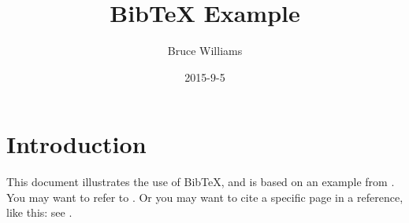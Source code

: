 \documentclass[12pt]{article}
\begin{document}
\title{BibTeX Example}
\author{Bruce Williams}
\date{2015-9-5}

\maketitle

\section{Introduction}
This document illustrates the use of BibTeX, and is based on an example from \cite{mjo08}.
You may want to refer to \cite{ahu61}.  Or you may want to cite a
specific page in a reference, like this: see \citet[p.~190]{ahu61}.



\end{document}
